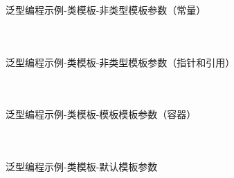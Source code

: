 \documentclass[UTF8,aspectratio=169]{beamer}
\begin{document}
\begin{frame}[fragile]{泛型编程示例-类模板-非类型模板参数（常量）}
    \begin{columns}
        \begin{column}{0.48\textwidth}
            \inputminted[firstline=1,lastline=15]{cpp}{code/gp_class_template_3.cpp}
        \end{column}
        \begin{column}{0.48\textwidth}
            \inputminted[firstline=17,lastline=26]{cpp}{code/gp_class_template_3.cpp}
        \end{column}
    \end{columns}
\end{frame}

\begin{frame}[fragile]{泛型编程示例-类模板-非类型模板参数（指针和引用）}
    \begin{columns}
        \begin{column}{0.48\textwidth}
            \inputminted[firstline=1,lastline=20]{cpp}{code/gp_class_template_4.cpp}
        \end{column}
        \begin{column}{0.48\textwidth}
            \inputminted[firstline=21,lastline=40]{cpp}{code/gp_class_template_4.cpp}
        \end{column}
    \end{columns}
\end{frame}

\begin{frame}[fragile]{泛型编程示例-类模板-模板模板参数（容器）}
    \begin{columns}
        \begin{column}{0.48\textwidth}
            \inputminted[firstline=1,lastline=20]{cpp}{code/gp_class_template_5.cpp}
        \end{column}
        \begin{column}{0.48\textwidth}
            \inputminted[firstline=21,lastline=40]{cpp}{code/gp_class_template_5.cpp}
        \end{column}
    \end{columns}
\end{frame}

\begin{frame}[fragile]{泛型编程示例-类模板-默认模板参数}
    \begin{columns}
        \begin{column}{0.48\textwidth}
            \inputminted[firstline=1,lastline=16]{cpp}{code/gp_class_template_6.cpp}
        \end{column}
        \begin{column}{0.48\textwidth}
            \inputminted[firstline=17,lastline=32]{cpp}{code/gp_class_template_6.cpp}
        \end{column}
    \end{columns}
\end{frame}
\end{document}
